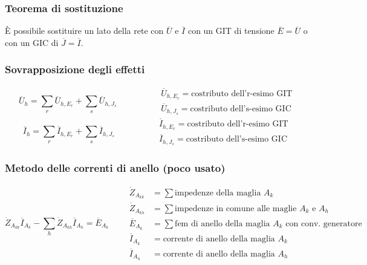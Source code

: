 \documentclass[a4paper]{article}
\begin{document}
\subsubsection*{Teorema di sostituzione}
È possibile sostituire un lato della rete con \(\overline{U}\) e \(\overline{I}\) con un GIT di tensione \(\overline{E} = \overline{U}\)
o con un GIC di \(\overline{J} = \overline{I}\).

\subsubsection*{Sovrapposizione degli effetti}
\[\overline{U}_h = \sum_r \overline{U}_{h,E_r} + \sum_s \overline{U}_{h,J_s} \qquad \qquad \begin{aligned} &\overline{U}_{h,E_r} = \text{costributo dell'r-esimo GIT} \\ &\overline{U}_{h,J_s} = \text{costributo dell's-esimo GIC}\end{aligned}\]
\[\overline{I}_h = \sum_r \overline{I}_{h,E_r} + \sum_s \overline{I}_{h,J_s} \qquad \qquad \begin{aligned} &\overline{I}_{h,E_r} = \text{costributo dell'r-esimo GIT} \\ &\overline{I}_{h,J_s} = \text{costributo dell's-esimo GIC}\end{aligned}\]

\subsubsection*{Metodo delle correnti di anello (poco usato)}
\[\dot{Z}_{A_{kk}} \overline{I}_{A_k} - \sum_h \dot{Z}_{A_{kh}} \overline{I}_{A_h} = \overline{E}_{A_k} \qquad
\begin{aligned}
	\dot{Z}_{A_{kk}} &= \sum \text{impedenze della maglia } A_k \\
	\dot{Z}_{A_{kh}} &= \sum \text{impedenze in comune alle maglie } A_k \text{ e } A_h \\
	\overline{E}_{A_k} &= \sum \text{fem di anello della maglia } A_k \text{ con conv. generatore} \\
	\overline{I}_{A_k} &= \text{corrente di anello della maglia } A_k \\
	\overline{I}_{A_h} &= \text{corrente di anello della maglia } A_h
\end{aligned}\]
\end{document}

